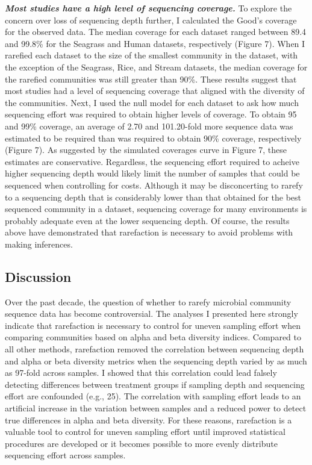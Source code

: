 \documentclass[
]{article}
\begin{document}
\textbf{\emph{Most studies have a high level of sequencing coverage.}}
To explore the concern over loss of sequencing depth further, I
calculated the Good's coverage for the observed data. The median
coverage for each dataset ranged between 89.4 and 99.8\% for the
Seagrass and Human datasets, respectively (Figure 7). When I rarefied
each dataset to the size of the smallest community in the dataset, with
the exception of the Seagrass, Rice, and Stream datasets, the median
coverage for the rarefied communities was still greater than 90\%. These
results suggest that most studies had a level of sequencing coverage
that aligned with the diversity of the communities. Next, I used the
null model for each dataset to ask how much sequencing effort was
required to obtain higher levels of coverage. To obtain 95 and 99\%
coverage, an average of 2.70 and 101.20-fold more sequence data was
estimated to be required than was required to obtain 90\% coverage,
respectively (Figure 7). As suggested by the simulated coverages curve
in Figure 7, these estimates are conservative. Regardless, the
sequencing effort required to acheive higher sequencing depth would
likely limit the number of samples that could be sequenced when
controlling for costs. Although it may be disconcerting to rarefy to a
sequencing depth that is considerably lower than that obtained for the
best sequenced community in a dataset, sequencing coverage for many
environments is probably adequate even at the lower sequencing depth. Of
course, the results above have demonstrated that rarefaction is
necessary to avoid problems with making inferences.

\hypertarget{discussion}{%
\subsection{Discussion}\label{discussion}}

Over the past decade, the question of whether to rarefy microbial
community sequence data has become controversial. The analyses I
presented here strongly indicate that rarefaction is necessary to
control for uneven sampling effort when comparing communities based on
alpha and beta diversity indices. Compared to all other methods,
rarefaction removed the correlation between sequencing depth and alpha
or beta diversity metrics when the sequencing depth varied by as much as
97-fold across samples. I showed that this correlation could lead
falsely detecting differences between treatment groups if sampling depth
and sequencing effort are confounded (e.g., 25). The correlation with
sampling effort leads to an artificial increase in the variation between
samples and a reduced power to detect true differences in alpha and beta
diversity. For these reasons, rarefaction is a valuable tool to control
for uneven sampling effort until improved statistical procedures are
developed or it becomes possible to more evenly distribute sequencing
effort across samples.
\end{document}
